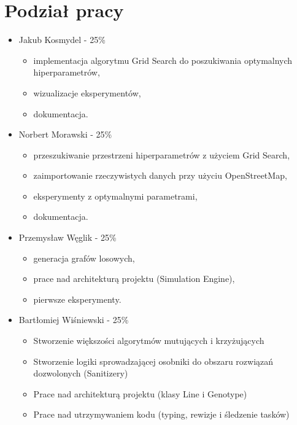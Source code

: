 \documentclass[12pt,a4paper]{article}
\begin{document}
\section{Podział pracy}
\begin{itemize}
    \item Jakub Kosmydel - 25\%
    \begin{itemize}
        \item implementacja algorytmu Grid Search do poszukiwania optymalnych hiperparametrów,
        \item wizualizacje eksperymentów,
        \item dokumentacja.
    \end{itemize}
    \item Norbert Morawski - 25\%
    \begin{itemize}
        \item przeszukiwanie przestrzeni hiperparametrów z użyciem Grid Search,
        \item zaimportowanie rzeczywistych danych przy użyciu OpenStreetMap,
        \item eksperymenty z optymalnymi parametrami,
        \item dokumentacja.
    \end{itemize}
    \item Przemysław Węglik - 25\%
    \begin{itemize}
        \item generacja grafów losowych,
        \item prace nad architekturą projektu (Simulation Engine),
        \item pierwsze eksperymenty.
    \end{itemize}
    \item Bartłomiej Wiśniewski - 25\%
    \begin{itemize}
        \item Stworzenie większości algorytmów mutujących i krzyżujących
        \item Stworzenie logiki sprowadzającej osobniki do obszaru rozwiązań dozwolonych (Sanitizery)
        \item Prace nad architekturą projektu (klasy Line i Genotype)
        \item Prace nad utrzymywaniem kodu (typing, rewizje i śledzenie tasków)
    \end{itemize}
\end{itemize}
\end{document}
